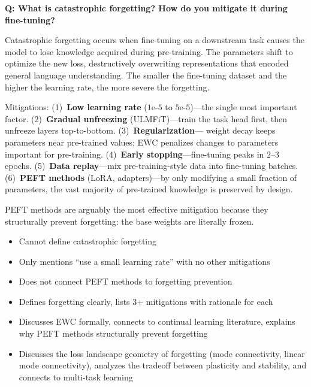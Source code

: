 \begin{interviewq}
\textbf{Q: What is catastrophic forgetting? How do you mitigate it during fine-tuning?}

 \quad {} \quad \badgefreq{\freqhigh}

\stronganswer
Catastrophic forgetting occurs when fine-tuning on a downstream task causes the model
to lose knowledge acquired during pre-training.  The parameters shift to optimize
the new loss, destructively overwriting representations that encoded general
language understanding.  The smaller the fine-tuning dataset and the higher the
learning rate, the more severe the forgetting.

Mitigations: (1)~\textbf{Low learning rate} ($1\text{e-}5$ to $5\text{e-}5$)---the
single most important factor. (2)~\textbf{Gradual unfreezing} (ULMFiT)---train the
task head first, then unfreeze layers top-to-bottom. (3)~\textbf{Regularization}---
weight decay keeps parameters near pre-trained values; EWC penalizes changes to
parameters important for pre-training. (4)~\textbf{Early stopping}---fine-tuning
peaks in 2--3 epochs. (5)~\textbf{Data replay}---mix pre-training-style data into
fine-tuning batches. (6)~\textbf{PEFT methods} (LoRA, adapters)---by only modifying
a small fraction of parameters, the vast majority of pre-trained knowledge is
preserved by design.

PEFT methods are arguably the most effective mitigation because they structurally
prevent forgetting: the base weights are literally frozen.

\redflags
\begin{itemize}
    \item Cannot define catastrophic forgetting
    \item Only mentions ``use a small learning rate'' with no other mitigations
    \item Does not connect PEFT methods to forgetting prevention
\end{itemize}


\goodgreat
\begin{itemize}
    \item {} Defines forgetting clearly, lists 3+ mitigations with
          rationale for each
    \item {} Discusses EWC formally, connects to continual learning
          literature, explains why PEFT methods structurally prevent forgetting
    \item {} Discusses the loss landscape geometry of forgetting
          (mode connectivity, linear mode connectivity), analyzes the tradeoff
          between plasticity and stability, and connects to multi-task learning
\end{itemize}

\end{interviewq}

